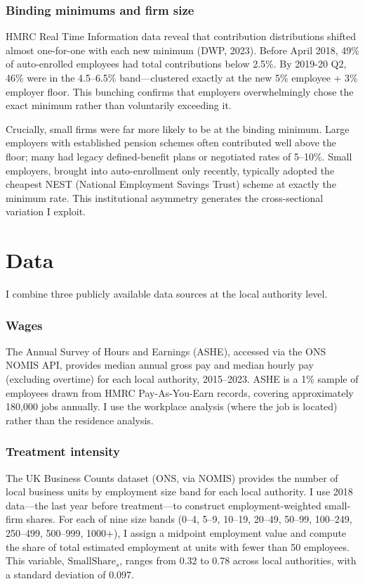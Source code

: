 \documentclass[12pt]{article}
\begin{document}
\subsubsection*{Binding minimums and firm size} HMRC Real Time Information data reveal that contribution distributions shifted almost one-for-one with each new minimum (DWP, 2023). Before April 2018, 49\% of auto-enrolled employees had total contributions below 2.5\%. By 2019-20 Q2, 46\% were in the 4.5--6.5\% band---clustered exactly at the new 5\% employee + 3\% employer floor. This bunching confirms that employers overwhelmingly chose the exact minimum rather than voluntarily exceeding it.

Crucially, small firms were far more likely to be at the binding minimum. Large employers with established pension schemes often contributed well above the floor; many had legacy defined-benefit plans or negotiated rates of 5--10\%. Small employers, brought into auto-enrollment only recently, typically adopted the cheapest NEST (National Employment Savings Trust) scheme at exactly the minimum rate. This institutional asymmetry generates the cross-sectional variation I exploit.


\section{Data}
\label{sec:data}

I combine three publicly available data sources at the local authority level.

\subsubsection*{Wages} The Annual Survey of Hours and Earnings (ASHE), accessed via the ONS NOMIS API, provides median annual gross pay and median hourly pay (excluding overtime) for each local authority, 2015--2023. ASHE is a 1\% sample of employees drawn from HMRC Pay-As-You-Earn records, covering approximately 180,000 jobs annually. I use the workplace analysis (where the job is located) rather than the residence analysis.

\subsubsection*{Treatment intensity} The UK Business Counts dataset (ONS, via NOMIS) provides the number of local business units by employment size band for each local authority. I use 2018 data---the last year before treatment---to construct employment-weighted small-firm shares. For each of nine size bands (0--4, 5--9, 10--19, 20--49, 50--99, 100--249, 250--499, 500--999, 1000+), I assign a midpoint employment value and compute the share of total estimated employment at units with fewer than 50 employees. This variable, $\text{SmallShare}_s$, ranges from 0.32 to 0.78 across local authorities, with a standard deviation of 0.097.
\end{document}
